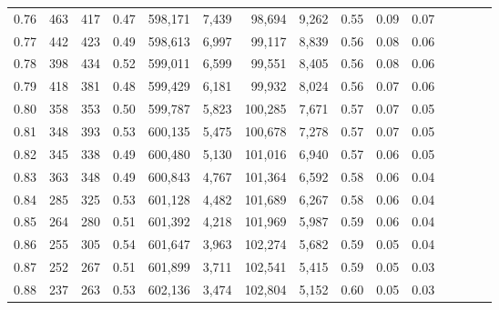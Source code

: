 \begin{tabular}{rrrcrrrrrrrrrrr}
0.76 &     463 &    417 &                                       0.47 &  598,171 &    7,439 &   98,694 &    9,262 &  0.55 &  0.09 &                         0.07 \\
0.77 &     442 &    423 &                                       0.49 &  598,613 &    6,997 &   99,117 &    8,839 &  0.56 &  0.08 &                         0.06 \\
0.78 &     398 &    434 &                                       0.52 &  599,011 &    6,599 &   99,551 &    8,405 &  0.56 &  0.08 &                         0.06 \\
0.79 &     418 &    381 &                                       0.48 &  599,429 &    6,181 &   99,932 &    8,024 &  0.56 &  0.07 &                         0.06 \\
0.80 &     358 &    353 &                                       0.50 &  599,787 &    5,823 &  100,285 &    7,671 &  0.57 &  0.07 &                         0.05 \\
0.81 &     348 &    393 &                                       0.53 &  600,135 &    5,475 &  100,678 &    7,278 &  0.57 &  0.07 &                         0.05 \\
0.82 &     345 &    338 &                                       0.49 &  600,480 &    5,130 &  101,016 &    6,940 &  0.57 &  0.06 &                         0.05 \\
0.83 &     363 &    348 &                                       0.49 &  600,843 &    4,767 &  101,364 &    6,592 &  0.58 &  0.06 &                         0.04 \\
0.84 &     285 &    325 &                                       0.53 &  601,128 &    4,482 &  101,689 &    6,267 &  0.58 &  0.06 &                         0.04 \\
0.85 &     264 &    280 &                                       0.51 &  601,392 &    4,218 &  101,969 &    5,987 &  0.59 &  0.06 &                         0.04 \\
0.86 &     255 &    305 &                                       0.54 &  601,647 &    3,963 &  102,274 &    5,682 &  0.59 &  0.05 &                         0.04 \\
0.87 &     252 &    267 &                                       0.51 &  601,899 &    3,711 &  102,541 &    5,415 &  0.59 &  0.05 &                         0.03 \\
0.88 &     237 &    263 &                                       0.53 &  602,136 &    3,474 &  102,804 &    5,152 &  0.60 &  0.05 &                         0.03 \\

\end{tabular}
